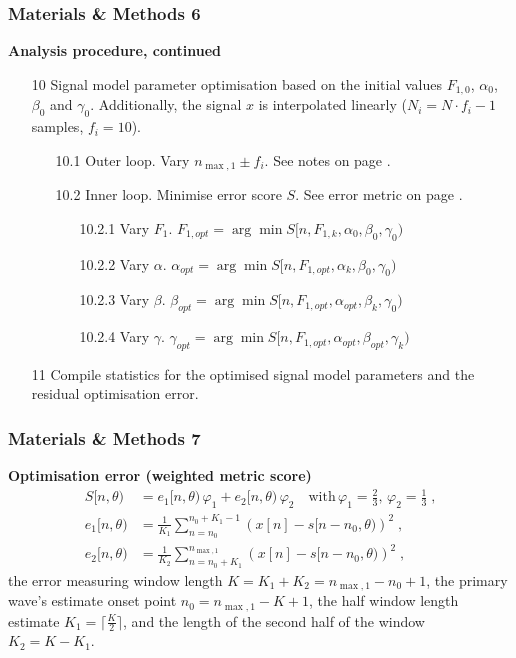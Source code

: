 	\begin{frame}
		\frametitle{Materials \& Methods 6}
		\textcolor{RIPtitlecol}{\textbf{Analysis procedure, continued \textellipsis{}}}
		\begin{enumerate}
			\setlength\itemsep{0.5em}
			\item[10] Signal model parameter optimisation based on the initial values $F_{1,0}$, $\alpha_0$, $\beta_0$ and $\gamma_0$. Additionally, the signal $x$ is interpolated linearly ($N_i = N \cdot f_i - 1$ samples, $f_i = 10$).
			\begin{itemize}
				\setlength\itemsep{0.5em}
				\item[10.1] Outer loop. Vary $n_{\max,1} \pm f_i$. See notes on page \pageref{mm:notes}.
				\item[10.2] Inner loop. Minimise error score $S$. See error metric on page \pageref{mm:error}.
				\begin{itemize}
					\setlength\itemsep{0.5em}
					\item[10.2.1] Vary $F_1$. $F_{1,opt} = \arg \min S[n, F_{1,k}, \alpha_0, \beta_0, \gamma_0)$
					\item[10.2.2] Vary $\alpha$. $\alpha_{opt} = \arg \min S[n, F_{1,opt}, \alpha_k, \beta_0, \gamma_0)$
					\item[10.2.3] Vary $\beta$. $\beta_{opt} = \arg \min S[n, F_{1,opt}, \alpha_{opt}, \beta_k, \gamma_0)$
					\item[10.2.4] Vary $\gamma$. $\gamma_{opt} = \arg \min S[n, F_{1,opt}, \alpha_{opt}, \beta_{opt}, \gamma_k)$
				\end{itemize}
			\end{itemize}
			\item[11] Compile statistics for the optimised signal model parameters and the residual optimisation error.
		\end{enumerate}
	\end{frame}

	\begin{frame}
		\frametitle{Materials \& Methods 7}\label{mm:error}
		\textcolor{RIPtitlecol}{\textbf{Optimisation error (weighted metric score)}}
		\begin{align}
			S[n,\theta) & = e_1[n,\theta) \, \varphi_1 + e_2[n,\theta) \, \varphi_2 \quad \text{with} \, \varphi_1 = \frac{2}{3}, \, \varphi_2 = \frac{1}{3} \; \text{,} \\
			e_1[n,\theta) & = \frac{1}{K_1} \sum_{n = n_0}^{n_0 + K_1 - 1}
				\left( x[n] - s[n - n_0,\theta) \right)^2 \; \text{,} \\
			e_2[n,\theta) & = \frac{1}{K_2} \sum_{n = n_0 + K_1}^{n_{\max,1}}
				\left( x[n] - s[n - n_0,\theta) \right)^2 \; \text{,}
		\end{align}
		the error measuring window length $K = K_1 + K_2 = n_{\max,1} - n_0 + 1$, the primary wave's estimate onset point $n_0 = n_{\max,1} - K + 1$, the half window length estimate $K_1 = \lceil \frac{K}{2} \rceil$, and the length of the second half of the window $K_2 = K - K_1$.
	\end{frame}

